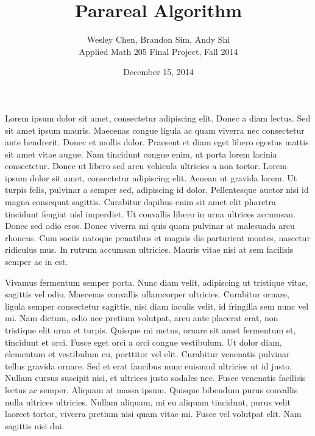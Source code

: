\documentclass[letterpaper,twocolumn,11pt]{report}
\begin{document}
\title{Parareal Algorithm}
\author{Wesley Chen, Brandon Sim, Andy Shi \\
Applied Math 205 Final Project, Fall 2014}
\date{December 15, 2014}
\maketitle

\setlength\parindent{0pt}

\setlength\parskip{2ex}


Lorem ipsum dolor sit amet, consectetur adipiscing elit. Donec a diam lectus.
Sed sit amet ipsum mauris. Maecenas congue ligula ac quam viverra nec
consectetur ante hendrerit. Donec et mollis dolor. Praesent et diam eget libero
egestas mattis sit amet vitae augue. Nam tincidunt congue enim, ut porta lorem
lacinia consectetur. Donec ut libero sed arcu vehicula ultricies a non tortor.
Lorem ipsum dolor sit amet, consectetur adipiscing elit. Aenean ut gravida
lorem. Ut turpis felis, pulvinar a semper sed, adipiscing id dolor. Pellentesque
auctor nisi id magna consequat sagittis. Curabitur dapibus enim sit amet elit
pharetra tincidunt feugiat nisl imperdiet. Ut convallis libero in urna ultrices
accumsan. Donec sed odio eros. Donec viverra mi quis quam pulvinar at malesuada
arcu rhoncus. Cum sociis natoque penatibus et magnis dis parturient montes,
nascetur ridiculus mus. In rutrum accumsan ultricies. Mauris vitae nisi at sem
facilisis semper ac in est.


Vivamus fermentum semper porta. Nunc diam velit, adipiscing ut tristique vitae,
sagittis vel odio. Maecenas convallis ullamcorper ultricies. Curabitur ornare,
ligula semper consectetur sagittis, nisi diam iaculis velit, id fringilla sem
nunc vel mi. Nam dictum, odio nec pretium volutpat, arcu ante placerat erat, non
tristique elit urna et turpis. Quisque mi metus, ornare sit amet fermentum et,
tincidunt et orci. Fusce eget orci a orci congue vestibulum. Ut dolor diam,
elementum et vestibulum eu, porttitor vel elit. Curabitur venenatis pulvinar
tellus gravida ornare. Sed et erat faucibus nunc euismod ultricies ut id justo.
Nullam cursus suscipit nisi, et ultrices justo sodales nec. Fusce venenatis
facilisis lectus ac semper. Aliquam at massa ipsum. Quisque bibendum purus
convallis nulla ultrices ultricies. Nullam aliquam, mi eu aliquam tincidunt,
purus velit laoreet tortor, viverra pretium nisi quam vitae mi. Fusce vel
volutpat elit. Nam sagittis nisi dui.
\end{document}
